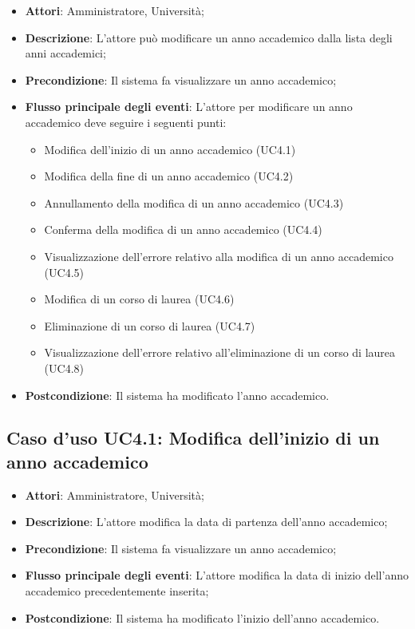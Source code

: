 \begin{itemize}
\item \textbf{Attori}: Amministratore, Università;
\item \textbf{Descrizione}: L'attore può modificare un anno accademico dalla lista degli anni accademici;
\item \textbf{Precondizione}: Il sistema fa visualizzare un anno accademico;
\item \textbf{Flusso principale degli eventi}: L'attore per modificare un anno accademico deve seguire i seguenti punti:
\begin{itemize}
\item Modifica dell'inizio di un anno accademico (UC4.1)
\item Modifica della fine di un anno accademico (UC4.2)
\item Annullamento della modifica di un anno accademico (UC4.3)
\item Conferma della modifica di un anno accademico (UC4.4)
\item Visualizzazione dell'errore relativo alla modifica di un anno accademico (UC4.5)
\item Modifica di un corso di laurea (UC4.6)
\item Eliminazione di un corso di laurea (UC4.7)
\item Visualizzazione dell'errore relativo all'eliminazione di un corso di laurea (UC4.8)
\end{itemize}
\item \textbf{Postcondizione}: Il sistema ha modificato l'anno accademico.
\end{itemize}
\subsection{Caso d'uso \texorpdfstring{UC4.1}{UC4.1}: Modifica dell'inizio di un anno accademico}
\begin{itemize}
\item \textbf{Attori}: Amministratore, Università;
\item \textbf{Descrizione}: L'attore modifica la data di partenza dell'anno accademico;
\item \textbf{Precondizione}: Il sistema fa visualizzare un anno accademico;
\item \textbf{Flusso principale degli eventi}: L'attore modifica la data di inizio dell'anno accademico precedentemente inserita;
\item \textbf{Postcondizione}: Il sistema ha modificato l'inizio dell'anno accademico.
\end{itemize}
